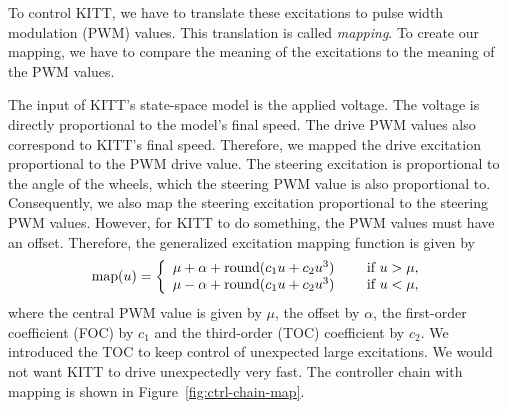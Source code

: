 \documentclass[11pt,titlepage]{report}
\begin{document}
To control KITT, we have to translate these excitations to pulse width modulation (PWM) values. This translation is called \textit{mapping}. To create our mapping, we have to compare the meaning of the excitations to the meaning of the PWM values.

The input of KITT's state-space model is the applied voltage. The voltage is directly proportional to the model's final speed. The drive PWM values also correspond to KITT's final speed. Therefore, we mapped the drive excitation proportional to the PWM drive value. The steering excitation is proportional to the angle of the wheels, which the steering PWM value is also proportional to. Consequently, we also map the steering excitation proportional to the steering PWM values. However, for KITT to do something, the PWM values must have an offset. Therefore, the generalized excitation mapping function is given by
\begin{equation} \label{eq:ctrl-mapping}
	\text{map}(u) = \left\{ \begin{array}{l l}
		\mu + \alpha + \text{round}(c_1 u + c_2 u^3) & \quad \text{ if } u > \mu, \\
		\mu - \alpha + \text{round}(c_1 u + c_2 u^3) & \quad \text{ if } u < \mu,
	\end{array} \right.
\end{equation}
where the central PWM value is given by $\mu$, the offset by $\alpha$, the first-order coefficient (FOC) by $c_1$ and the third-order (TOC) coefficient by $c_2$. We introduced the TOC to keep control of unexpected large excitations. We would not want KITT to drive unexpectedly very fast. The controller chain with mapping is shown in Figure~\ref{fig:ctrl-chain-map}.
\end{document}

